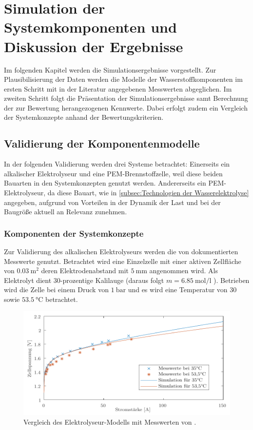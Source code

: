 \chapter{Simulation der Systemkomponenten und Diskussion der Ergebnisse}
\label{cha:Diskussion}
Im folgenden Kapitel werden die Simulationsergebnisse vorgestellt. Zur Plausibilisierung der Daten werden die Modelle der Wasserstoffkomponenten im ersten Schritt mit in der Literatur angegebenen Messwerten abgeglichen. Im zweiten Schritt folgt die Präsentation der Simulationsergebnisse samt Berechnung der zur Bewertung herangezogenen Kennwerte. Dabei erfolgt zudem ein Vergleich der Systemkonzepte anhand der Bewertungskriterien.
 
\section{Validierung der Komponentenmodelle}
\label{sec:Sektion 1}
In der folgenden Validierung werden drei Systeme betrachtet: Einerseits ein alkalischer Elektrolyseur und eine PEM-Brennstoffzelle, weil diese beiden Bauarten in den Systemkonzepten genutzt werden. Andererseits ein PEM-Elektrolyseur, da diese Bauart, wie in \ref{subsec:Technologien der Wasserelektrolyse} angegeben, aufgrund von Vorteilen in der Dynamik der Last und bei der Baugröße aktuell an Relevanz zunehmen. 

\subsection{Komponenten der Systemkonzepte}
Zur Validierung des alkalischen Elektrolyseurs werden die von \citet{hammoudi_new_2012} dokumentierten Messwerte genutzt. Betrachtet wird eine Einzelzelle mit einer aktiven Zellfläche von $\SI{0,03}{\m\squared}$ deren Elektrodenabstand mit $\SI{5}{\milli\m}$ angenommen wird. Als Elektrolyt dient $30$-prozentige Kalilauge (daraus folgt $m=\SI{6,85}{\mol\per\l}$ \citep{periodensystem-online_dichtewerttabelle_nodate}). Betrieben wird die Zelle bei einem Druck von $\SI{1}{\bar}$ und es wird eine Temperatur von $30$ sowie $\SI{53,5}{\degreeCelsius}$ betrachtet.

\begin{figure}[h]
	\centering
		\includegraphics[scale=1]{Figures/ValidierungALK}
		\caption{Vergleich des Elektrolyseur-Modells mit Messwerten von \citet{hammoudi_new_2012}.}
\label{fig:ValALK}	
\end{figure}

